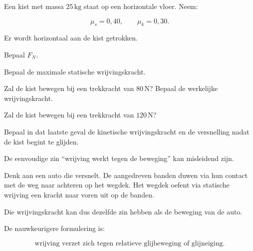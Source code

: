 \documentclass{ximera}
\begin{document}
\begin{oefening}{\oefU\ESS}

Een kist met massa $25\,\mathrm{kg}$ staat op een horizontale vloer.
Neem:

\[
\mu_s=0,40,
\qquad
\mu_k=0,30.
\]

Er wordt horizontaal aan de kist getrokken.

\begin{question}
Bepaal $F_N$.
\end{question}

\begin{question}
Bepaal de maximale statische wrijvingskracht.
\end{question}

\begin{question}
Zal de kist bewegen bij een trekkracht van $80\,\mathrm N$?
Bepaal de werkelijke wrijvingskracht.
\end{question}

\begin{question}
Zal de kist bewegen bij een trekkracht van $120\,\mathrm N$?
\end{question}

\begin{question}
Bepaal in dat laatste geval de kinetische wrijvingskracht en de
versnelling nadat de kist begint te glijden.
\end{question}

\end{oefening}




De eenvoudige zin ``wrijving werkt tegen de beweging'' kan misleidend
zijn.

Denk aan een auto die versnelt. De aangedreven banden duwen via hun
contact met de weg naar achteren op het wegdek. Het wegdek oefent via
statische wrijving een kracht naar voren uit op de banden.

Die wrijvingskracht kan dus dezelfde zin hebben als de beweging van de
auto.

De nauwkeurigere formulering is:

\[
\boxed{
\text{wrijving verzet zich tegen relatieve glijbeweging of glijneiging.}
}
\]
\end{document}
